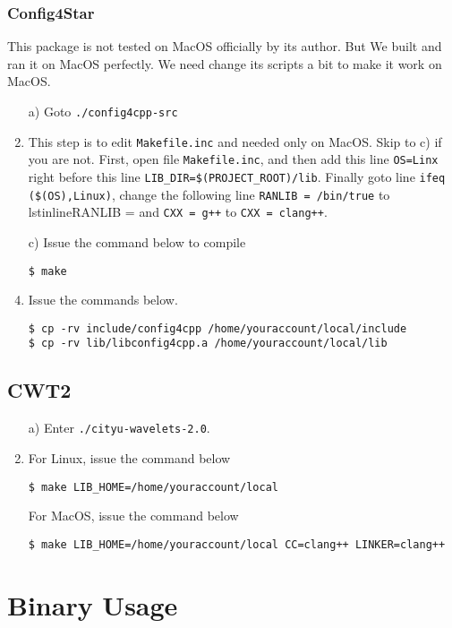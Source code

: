 \documentclass[a4paper,5pt]{article}
\begin{document}
\subsubsection{Config4Star}
This package is not tested on MacOS officially by its author. But We built and ran it on MacOS perfectly. We need change its scripts a bit to make it work on MacOS.

\begin{enumerate}
\item[a)] Goto \lstinline{./config4cpp-src}
\item[b)] This step is to edit \lstinline{Makefile.inc} and needed only on MacOS. Skip to c) if you are not.
First, open file \lstinline{Makefile.inc}, and then add this line \lstinline{OS=Linx} right before this line \lstinline{LIB_DIR=$(PROJECT_ROOT)/lib}. Finally goto line \lstinline{ifeq ($(OS),Linux)}, change the following line \lstinline{RANLIB = /bin/true} to lstinline{RANLIB = } and \lstinline{CXX = g++} to \lstinline{CXX = clang++}.
\item[c)] Issue the command below to compile

\lstinline{$ make}
\item[d)] Issue the commands below.

\lstinline{$ cp -rv include/config4cpp /home/youraccount/local/include}        \\
\lstinline{$ cp -rv lib/libconfig4cpp.a /home/youraccount/local/lib}
\end{enumerate}

\subsection{CWT2}
\begin{enumerate}
\item[a)] Enter \lstinline{./cityu-wavelets-2.0}.
\item[b)] For Linux, issue the command below

\lstinline{$ make LIB_HOME=/home/youraccount/local}

For MacOS, issue the command below

\lstinline{$ make LIB_HOME=/home/youraccount/local CC=clang++ LINKER=clang++}

\end{enumerate}


\section{Binary Usage}
\end{document}
